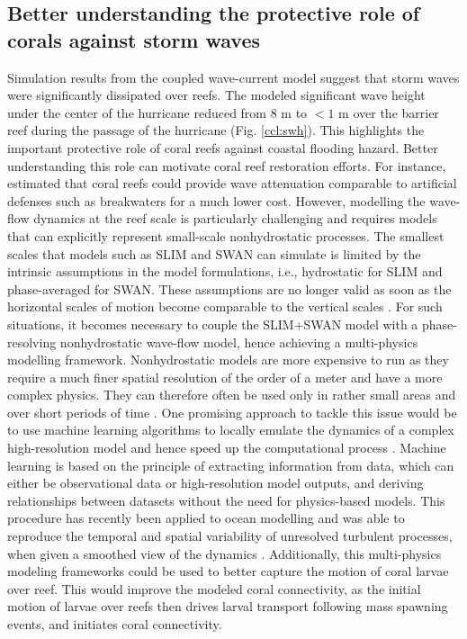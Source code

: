 \subsection*{Better understanding the protective role of corals against storm waves}
Simulation results from the coupled wave-current model suggest that storm waves were significantly dissipated over reefs. The modeled significant wave height under the center of the hurricane reduced from 8 m to $<1$ m over the barrier reef during the passage of the hurricane (Fig. \ref{ccl:swh}). This highlights the important protective role of coral reefs against coastal flooding hazard. Better understanding this role can motivate coral reef restoration efforts. For instance, \cite{ferrario2014effectiveness} estimated that coral reefs could provide wave attenuation comparable to artificial defenses such as breakwaters for a much lower cost. However, modelling the wave-flow dynamics at the reef scale is particularly challenging and requires models that can explicitly represent small-scale nonhydrostatic processes. The smallest scales that models such as SLIM and SWAN can simulate is limited by the intrinsic assumptions in the model formulations, i.e., hydrostatic for SLIM and phase-averaged for SWAN. These assumptions are no longer valid as soon as the horizontal scales of motion become comparable to the vertical scales \citep{marshall1997hydrostatic}. For such situations, it becomes necessary to couple the SLIM+SWAN model with a phase-resolving nonhydrostatic wave-flow model, hence achieving a multi-physics modelling framework. Nonhydrostatic models are more expensive to	 run as they require a much finer spatial resolution of the order of a meter and have a more complex physics. They can therefore often be used only in rather small areas and over short periods of time \citep{fringer2019future}. One promising approach to tackle this issue would be to use machine learning algorithms to locally emulate the dynamics of a complex high-resolution model and hence speed up the computational process \citep{kasim2021building}. Machine learning is based on the principle of extracting information from data, which can either be observational data or high-resolution model outputs, and deriving relationships between datasets without the need for physics-based models. This procedure has recently been applied to ocean modelling and was able to reproduce the temporal and spatial variability of unresolved turbulent processes, when given a smoothed view of the dynamics \citep{bolton2019applications}. Additionally, this multi-physics modeling frameworks could be used to better capture the motion of coral larvae over reef. This would improve the modeled coral connectivity, as the initial motion of larvae over reefs then drives larval transport following mass spawning events, and initiates coral connectivity. 

